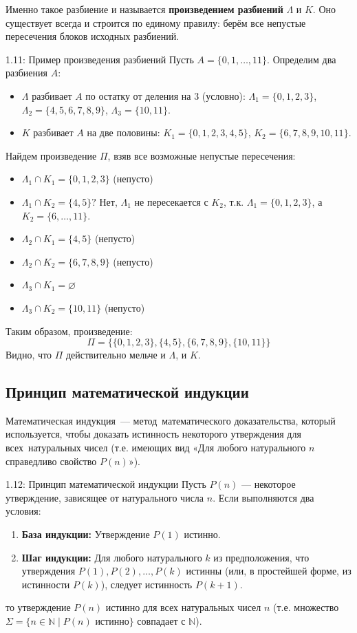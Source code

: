 \documentclass[a4paper,12pt]{article}
\begin{document}
Именно такое разбиение и называется \textbf{произведением разбиений} $\Lambda$ и $K$. Оно существует всегда и строится по единому правилу: берём все непустые пересечения блоков исходных разбиений.


\begin{examplebox}{1.11: Пример произведения разбиений}
	Пусть $A = \{0,1,\dots,11\}$. Определим два разбиения $A$:
	\begin{itemize}
		\item $\Lambda$ разбивает $A$ по остатку от деления на 3 (условно):
		$\Lambda_1 = \{0,1,2,3\}$,
		$\Lambda_2 = \{4,5,6,7,8,9\}$,
		$\Lambda_3 = \{10,11\}$.
		\item $K$ разбивает $A$ на две половины:
		$K_1 = \{0,1,2,3,4,5\}$,
		$K_2 = \{6,7,8,9,10,11\}$.
	\end{itemize}
	Найдем произведение $\Pi$, взяв все возможные непустые пересечения:
	\begin{itemize}
		\item $\Lambda_1 \cap K_1 = \{0,1,2,3\}$ (непусто)
		\item $\Lambda_1 \cap K_2 = \{4,5\}?$ Нет, $\Lambda_1$ не пересекается с $K_2$, т.к. $\Lambda_1 = \{0,1,2,3\}$, а $K_2 = \{6,\dots,11\}$.
		\item $\Lambda_2 \cap K_1 = \{4,5\}$ (непусто)
		\item $\Lambda_2 \cap K_2 = \{6,7,8,9\}$ (непусто)
		\item $\Lambda_3 \cap K_1 = \varnothing$
		\item $\Lambda_3 \cap K_2 = \{10,11\}$ (непусто)
	\end{itemize}
	Таким образом, произведение:
	\[ \Pi = \{ \{0,1,2,3\}, \{4,5\}, \{6,7,8,9\}, \{10,11\} \} \]
	Видно, что $\Pi$ действительно мельче и $\Lambda$, и $K$.
\end{examplebox}

\subsection{Принцип математической индукции}

Математическая индукция — метод математического доказательства, который используется, чтобы доказать истинность некоторого утверждения для всех натуральных чисел (т.е. имеющих вид «Для любого натурального $n$ справедливо свойство $P(n)$»).

\begin{theorembox}{1.12: Принцип математической индукции}
	Пусть $P(n)$ — некоторое утверждение, зависящее от натурального числа $n$. Если выполняются два условия:
	\begin{enumerate}
		\item \textbf{База индукции:} Утверждение $P(1)$ истинно.
		\item \textbf{Шаг индукции:} Для любого натурального $k$ из предположения, что утверждения $P(1), P(2), \dots, P(k)$ истинны (или, в простейшей форме, из истинности $P(k)$), следует истинность $P(k+1)$.
	\end{enumerate}
	то утверждение $P(n)$ истинно для всех натуральных чисел $n$ (т.е. множество $\Sigma = \{ n \in \mathbb{N} \mid P(n) \text{ истинно} \}$ совпадает с $\mathbb{N}$).
\end{theorembox}
\end{document}
